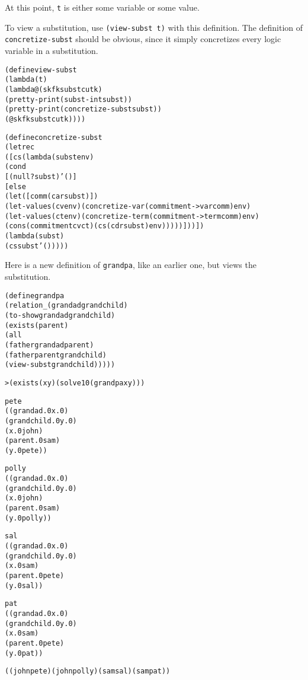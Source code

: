 \noindent
At this point, \texttt{t} is either some variable or some value.  

To view a substitution, use \texttt{(view-subst t)} with this
definition.  The definition of \texttt{concretize-subst} should
be obvious, since it simply concretizes every logic variable in
a substitution.  

\begin{alltt}
(define view-subst
  (lambda (t)
    (lambda@ (sk fk subst cutk)
      (pretty-print (subst-in t subst))
      (pretty-print (concretize-subst subst))
      (@ sk fk subst cutk))))

(define concretize-subst
  (letrec
    ([cs (lambda (subst env)
           (cond
             [(null? subst) '()]
             [else
               (let ([comm (car subst)])
                 (let-values (cv env) (concretize-var (commitment->var comm) env)
                   (let-values (ct env) (concretize-term (commitment->term comm) env)
                     (cons (commitment cv ct) (cs (cdr subst) env)))))]))])
    (lambda (subst)
      (cs subst '()))))
\end{alltt}

Here is a new definition of \texttt{grandpa}, like an earlier one,
but views the substitution.

\begin{alltt}
(define grandpa
  (relation _ (grandad grandchild)
    (to-show grandad grandchild)
    (exists (parent)
      (all
        (father grandad parent)
        (father parent grandchild)
        (view-subst grandchild)))))
\end{alltt}

\begin{alltt}
> (exists (x y) (solve 10 (grandpa x y)))

pete
((grandad.0 x.0)
 (grandchild.0 y.0)
 (x.0 john)
 (parent.0 sam)
 (y.0 pete))
\end{alltt}
\newpage
\begin{alltt}
polly
((grandad.0 x.0)
 (grandchild.0 y.0)
 (x.0 john)
 (parent.0 sam)
 (y.0 polly))
\end{alltt}

\begin{alltt}
sal
((grandad.0 x.0)
 (grandchild.0 y.0)
 (x.0 sam)
 (parent.0 pete)
 (y.0 sal))

pat
((grandad.0 x.0)
 (grandchild.0 y.0)
 (x.0 sam)
 (parent.0 pete)
 (y.0 pat))

((john pete) (john polly) (sam sal) (sam pat))
\end{alltt}

